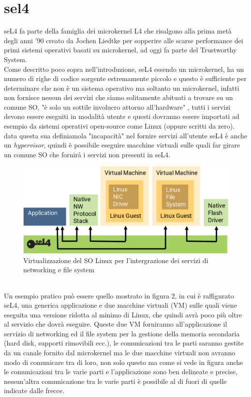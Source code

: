 \chapter{sel4}
seL4 fa parte della famiglia dei microkernel L4 che risalgono alla prima metà degli anni '90 creato da Jochen Liedtke per sopperire alle scarse performance dei primi sistemi operativi basati su microkernel, ad oggi fa parte del Trustworthy System.\\
Come descritto poco sopra nell'introduzione, seL4 essendo un microkernel, ha un numero di righe di codice sorgente estremamente piccolo e questo è sufficiente per determinare che non è un sistema operativo ma soltanto un microkernel, infatti non fornisce nessun dei servizi che siamo solitamente abituati a trovare su un comune SO, "è solo un sottile involucro attorno all'hardware" \cite{sel4-whitepaper}, tutti i servizi devono essere eseguiti in modalità utente e questi dovranno essere importati ad esempio da sistemi operativi open-source come Linux (oppure scritti da zero). data questa sua definiamola "incapacità" nel fornire servizi all'utente seL4 è anche un \textit{hypervisor}, quindi è possibile eseguire macchine virtuali sulle quali far girare un comune SO che fornirà i servizi non presenti in seL4.\\
\begin{figure}[h]
  \includegraphics[width=\linewidth]{img/seL4Hypervisor.png}
  \caption{Virtualizzazione del SO Linux per l'intergrazione dei servizi di networking e file system}
  \label{fig:MonolithicVSmicrokernel}
\end{figure}\\

Un esempio pratico può essere quello mostrato in figura 2, in cui è raffigurato seL4, una generica applicazione e due macchine virtuali (VM) sulle quali viene eseguita una versione ridotta al minimo di Linux, che quindi avrà poco più oltre al servizio che dovrà eseguire.
Queste due VM forniranno all'applicazione il servizio di networking ed il file system per la gestione della memoria secondaria (hard disk, supporti rimovibili ecc.), le comunicazioni tra le parti saranno gestite da un canale fornito dal microkernel ma le due macchine virtuali non avranno modo di comunicare tra di loro, non solo questo ma come si vede in figura anche le comunicazioni tra le varie parti e l'applicazione sono ben delineate e precise, nessun'altra comunicazione tra le varie parti è possibile al di fuori di quelle indicate dalle frecce.

